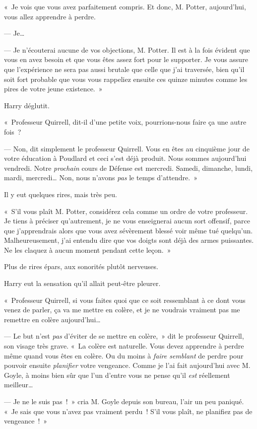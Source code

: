 «~Je vois que vous avez parfaitement compris. Et donc, M. Potter, aujourd'hui, vous allez apprendre à perdre.

--- Je…

--- Je n'écouterai aucune de vos objections, M. Potter. Il est à la fois évident que vous en avez besoin et que vous êtes assez fort pour le supporter. Je vous assure que l'expérience ne sera pas aussi brutale que celle que j'ai traversée, bien qu'il soit fort probable que vous vous rappeliez ensuite ces quinze minutes comme les pires de votre jeune existence.~»

Harry déglutit.

«~Professeur Quirrell, dit-il d'une petite voix, pourrions-nous faire ça une autre fois~?

--- Non, dit simplement le professeur Quirrell. Vous en êtes au cinquième jour de votre éducation à Poudlard et ceci s'est déjà produit. Nous sommes aujourd'hui vendredi. Notre \emph{prochain} cours de Défense est mercredi. Samedi, dimanche, lundi, mardi, mercredi… Non, nous n'avons \emph{pas} le temps d'attendre.~»

Il y eut quelques rires, mais très peu.

«~S'il vous plaît M. Potter, considérez cela comme un ordre de votre professeur. Je tiens à préciser qu'autrement, je ne vous enseignerai aucun sort offensif, parce que j'apprendrais alors que vous avez sévèrement blessé voir même tué quelqu'un. Malheureusement, j'ai entendu dire que vos doigts sont déjà des armes puissantes. Ne les claquez à aucun moment pendant cette leçon.~»

Plus de rires épars, aux sonorités plutôt nerveuses.

Harry eut la sensation qu'il allait peut-être pleurer.

«~Professeur Quirrell, si vous faites quoi que ce soit ressemblant à ce dont vous venez de parler, ça va me mettre en colère, et je ne voudrais vraiment pas me remettre en colère aujourd'hui…

--- Le but n'est \emph{pas} d'éviter de se mettre en colère,~» dit le professeur Quirrell, son visage très grave. «~La colère est naturelle. Vous devez apprendre à perdre même quand vous êtes en colère. Ou du moins à \emph{faire semblant} de perdre pour pouvoir ensuite \emph{planifier} votre vengeance. Comme je l'ai fait aujourd'hui avec M. Goyle, à moins bien sûr que l'un d'entre vous ne pense qu'il \emph{est} réellement meilleur…

--- Je ne le suis pas~!~» cria M. Goyle depuis son bureau, l'air un peu paniqué. «~Je sais que vous n'avez pas vraiment perdu~! S'il vous plaît, ne planifiez pas de vengeance~!~»


